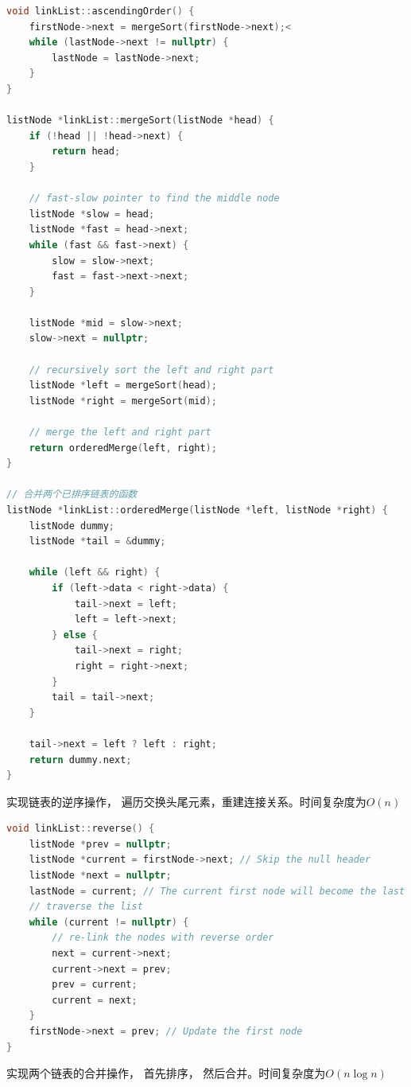 \documentclass{csexp}
\begin{document}
\begin{lstlisting}[language=C++]
void linkList::ascendingOrder() {
    firstNode->next = mergeSort(firstNode->next);<
    while (lastNode->next != nullptr) {
        lastNode = lastNode->next;
    }
}

listNode *linkList::mergeSort(listNode *head) {
    if (!head || !head->next) {
        return head;
    }

    // fast-slow pointer to find the middle node
    listNode *slow = head;
    listNode *fast = head->next;
    while (fast && fast->next) {
        slow = slow->next;
        fast = fast->next->next;
    }

    listNode *mid = slow->next;
    slow->next = nullptr;

    // recursively sort the left and right part
    listNode *left = mergeSort(head);
    listNode *right = mergeSort(mid);

    // merge the left and right part
    return orderedMerge(left, right);
}

// 合并两个已排序链表的函数
listNode *linkList::orderedMerge(listNode *left, listNode *right) {
    listNode dummy;
    listNode *tail = &dummy;

    while (left && right) {
        if (left->data < right->data) {
            tail->next = left;
            left = left->next;
        } else {
            tail->next = right;
            right = right->next;
        }
        tail = tail->next;
    }

    tail->next = left ? left : right;
    return dummy.next;
}
\end{lstlisting}

实现链表的逆序操作， 遍历交换头尾元素，重建连接关系。时间复杂度为$O(n)$

\begin{lstlisting}[language=C++]
void linkList::reverse() {
    listNode *prev = nullptr;
    listNode *current = firstNode->next; // Skip the null header
    listNode *next = nullptr;
    lastNode = current; // The current first node will become the last node
    // traverse the list 
    while (current != nullptr) {
        // re-link the nodes with reverse order
        next = current->next;
        current->next = prev;
        prev = current;
        current = next;
    }
    firstNode->next = prev; // Update the first node
}
\end{lstlisting}

实现两个链表的合并操作， 首先排序， 然后合并。时间复杂度为$O(n\log n)$
\end{document}
